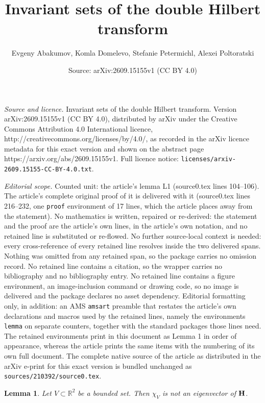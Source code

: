 \documentclass[10pt,a4paper]{amsart}
\title{Invariant sets of the double Hilbert transform}
\author{Evgeny Abakumov, Komla Domelevo, Stefanie Petermichl, Alexei Poltoratski}
\date{Source: arXiv:2609.15155v1 (CC BY 4.0)}
\newtheorem{lemma}{Lemma}
\def\H{{\bf H}}
\def\R{{\mathbb R}}
\begin{document}
\maketitle

\noindent\emph{Source and licence.} Invariant sets of the double Hilbert transform. Version arXiv:2609.15155v1 (CC BY 4.0), distributed by arXiv under the Creative Commons Attribution 4.0 International licence, http://creativecommons.org/licenses/by/4.0/, as recorded in the arXiv licence metadata for this exact version and shown on the abstract page https://arxiv.org/abs/2609.15155v1. Full licence notice: \texttt{licenses/arxiv-2609.15155-CC-BY-4.0.txt}.\par\smallskip

\noindent\textit{Editorial scope.} Counted unit: the article's lemma L1 (source0.tex lines 104--106). The article's complete original proof of it is delivered with it (source0.tex lines 216--232, one \texttt{proof} environment of 17 lines, which the article places away from the statement). No mathematics is written, repaired or re-derived: the statement and the proof are the article's own lines, in the article's own notation, and no retained line is substituted or re-flowed.  No further source-local context is needed: every cross-reference of every retained line resolves inside the two delivered spans.  Nothing was omitted from any retained span, so the package carries no omission record.  No retained line contains a citation, so the wrapper carries no bibliography and no bibliography entry.  No retained line contains a figure environment, an image-inclusion command or drawing code, so no image is delivered and the package declares no asset dependency.  Editorial formatting only, in addition: an AMS \texttt{amsart} preamble that restates the article's own declarations and macros used by the retained lines, namely the environments \texttt{lemma} on separate counters, together with the standard packages those lines need.  The retained environments print in this document as Lemma 1 in order of appearance, whereas the article prints the same items with the numbering of its own full document.  The complete native source of the article as distributed in the arXiv e-print for this exact version is bundled unchanged as \texttt{sources/210392/source0.tex}.
	\begin{lemma}\label{L1}
		Let $V\subset \R^2$ be a bounded set. Then $\chi_V$ is not an eigenvector of $\H$.
	\end{lemma}
\end{document}
